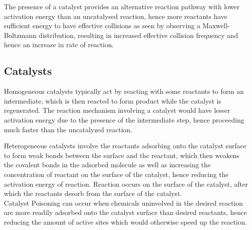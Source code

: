 \documentclass[../main]{subfiles}
\begin{document}
	The presence of a catalyst provides an alternative reaction pathway with lower activation energy than an uncatalysed reaction, hence more reactants have sufficient energy to have effective collisions as seen by observing a Maxwell-Boltzmann distribution, resulting in increased effective collision frequency and hence an increase in rate of reaction.

	\subsection{Catalysts}





	Homogeneous catalysts typically act by reacting with some reactants to form an intermediate, which is then reacted to form product while the catalyst is regenerated. The reaction mechanism involving a catalyst would have lesser activation energy due to the presence of the intermediate step, hence proceeding much faster than the uncatalyzed reaction.


	Heterogeneous catalysts involve the reactants adsorbing onto the catalyst surface to form weak bonds between the surface and the reactant, which then weakens the covalent bonds in the adsorbed molecule as well as increasing the concentration of reactant on the surface of the catalyst, hence reducing the activation energy of reaction. Reaction occurs on the surface of the catalyst, after which the reactants desorb from the surface of the catalyst. \\

	Catalyst Poisoning can occur when chemicals uninvolved in the desired reaction are more readily adsorbed onto the catalyst surface than desired reactants, hence reducing the amount of active sites which would otherwise speed up the reaction.

\end{document}
